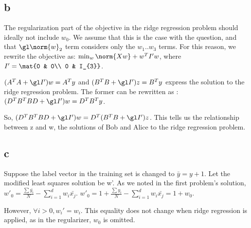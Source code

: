 \documentclass{article}
\begin{document}
\subsection{b}
The regularization part of the objective in the ridge regression problem should ideally not include $w_{0}$. We assume that this is the case with the question, and that $\gl \norm{w}_{2}$ term considers only the $w_{1} .. w_{3}$  terms. For this reason, we rewrite the objective as: $\min_{w} \norm{Xw} + w^{T}I'w$, where $I' = \mat{0 & 0\\ 0 & I_{3}}$.

$(A^{T}A + \gl I')w = A^{T}y$ and $(B^{T}B + \gl I')z = B^{T}y$ express the solution to the ridge regression problem. The former can be rewritten as : $(D^{T}B^{T}BD + \gl I')w = D^{T}B^{T}y$.

So, $(D^{T}B^{T}BD + \gl I')w = D^{T}(B^{T}B + \gl I')z$. This tells us the relationship between z and w, the solutions of Bob and Alice to the ridge regression problem.

\subsection{c}
Suppose the label vector in the training set is changed to $\bar{y} = y + 1$. Let the modified least squares solution be w'. As we noted in the first problem's solution, $w'_{0} = \frac{\sum \bar{y_{i}}}{N} - \sum_{i=1}^{d} w_{i}\bar{x_{j}}$. $w'_{0} = 1 + \frac{\sum y_{i}}{N} - \sum_{i=1}^{d} w_{i}\bar{x_{j}} = 1 + w_{0}$.

However, $\forall i>0, w_{i}' = w_{i}$. This equality does not change when ridge regression is applied, as in the regularizer, $w_{0}$ is omitted.

% 
% 
\end{document}
